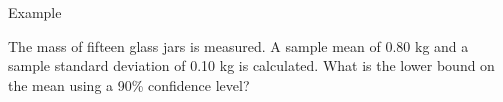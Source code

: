 \begin{frame}{Example}

  The mass of fifteen glass jars is measured. A sample mean of 0.80 kg
  and a sample standard deviation of 0.10 kg is calculated. What is
  the lower bound on the mean using a 90\% confidence level?

  \vfill

  
\end{frame}


